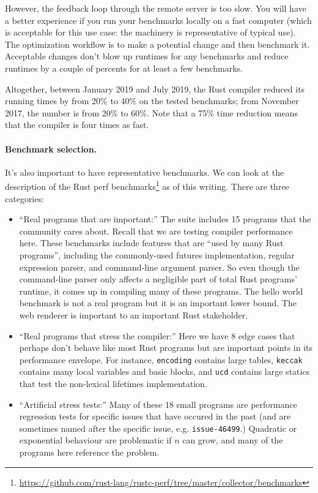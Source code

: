 \documentclass[a4paper]{report}
\begin{document}
However, the feedback loop through the remote server is too slow. You
will have a better experience if you run your benchmarks locally on a
fast computer (which is acceptable for this use case: the machinery is
representative of typical use). The optimization workflow is to make a
potential change and then benchmark it. Acceptable changes don't blow
up runtimes for any benchmarks and reduce runtimes by a couple of
percents for at least a few benchmarks.

Altogether, between January 2019 and July 2019, the Rust compiler reduced
its running times by from 20\% to 40\% on the tested benchmarks; from November 2017,
the number is from 20\% to 60\%. Note that a 75\% time reduction means that the compiler
is four times as fast.

\paragraph{Benchmark selection.} It's also important to have representative
benchmarks. We can look at the description of the Rust perf benchmarks\footnote{\url{https://github.com/rust-lang/rustc-perf/tree/master/collector/benchmarks}}
as of this writing.
There are three categories:
\begin{itemize}
\item ``Real programs that are important:'' The suite includes 15 programs that the community cares about.
Recall that we are testing compiler performance here.  These
benchmarks include features that are ``used by many Rust programs'',
including the commonly-used futures implementation, regular expression
parser, and command-line argument parser.  So even though the
command-line parser only affects a negligible part of total Rust
programs' runtime, it comes up in compiling many of these programs.
The hello world benchmark is not a real program but it is an
important lower bound. The web renderer is important to an important Rust stakeholder.
\item ``Real programs that stress the compiler:'' Here we have 8 edge cases
that perhaps don't behave like most Rust programs but are important points in its performance
envelope. For instance, \texttt{encoding} contains large tables, \texttt{keccak} contains many local variables
and basic blocks, and \texttt{ucd} contains large statics that test the non-lexical lifetimes implementation.
\item ``Artificial stress tests:'' Many of these 18 small programs are performance regression tests for specific issues that
have occured in the past (and are sometimes named after the specific issue, e.g. \texttt{issue-46499}.)
Quadratic or exponential behaviour are problematic if $n$ can grow, and many of the programs here
reference the problem.
\end{itemize}
\end{document}
